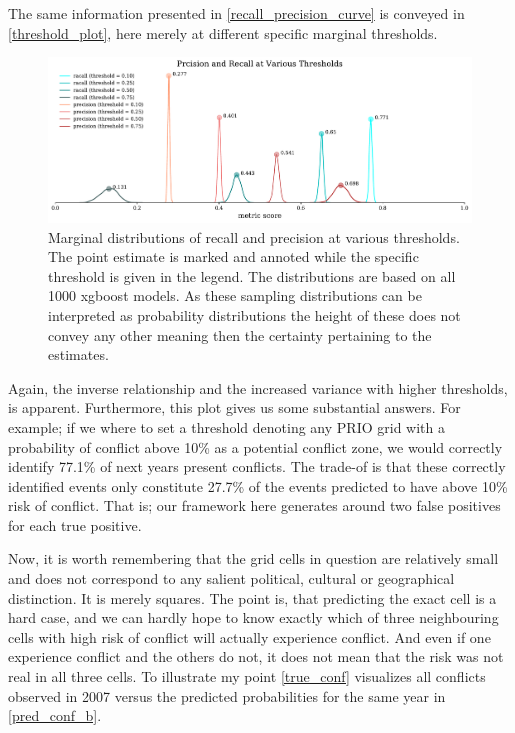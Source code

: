 \documentclass[a4paper]{article}
\begin{document}
The same information presented in \autoref{recall_precision_curve} is conveyed in \autoref{threshold_plot}, here merely at different specific marginal thresholds.\par

\begin{figure}[!htb]
	\centering
	\includegraphics[scale=0.5]{threshold_plot.pdf}
    \caption{\footnotesize{Marginal distributions of recall and precision at various thresholds. The point estimate is marked and annoted while the specific threshold is given in the legend. The distributions are based on all 1000 xgboost models. As these sampling distributions can be interpreted as probability distributions the height of these does not convey any other meaning then the certainty pertaining to the estimates.}}\label{threshold_plot}
\end{figure}

Again, the inverse relationship and the increased variance with higher thresholds, is apparent. Furthermore, this plot gives us some substantial answers. For example; if we where to set a threshold denoting any PRIO grid with a probability of conflict above 10\% as a potential conflict zone, we would correctly identify 77.1\% of next years present conflicts. The trade-of is that these correctly identified events only constitute 27.7\% of the events predicted to have above 10\% risk of conflict. That is; our framework here generates around two false positives for each true positive.\par

Now, it is worth remembering that the grid cells in question are relatively small and does not correspond to any salient political, cultural or geographical distinction. It is merely squares. The point is, that predicting the exact cell is a hard case, and we can hardly hope to know exactly which of three neighbouring cells with high risk of conflict will actually experience conflict. And even if one experience conflict and the others do not, it does not mean that the risk was not real in all three cells. To illustrate my point \autoref{true_conf} visualizes all conflicts observed in 2007 versus the predicted probabilities for the same year in \autoref{pred_conf_b}.\par
\end{document}
